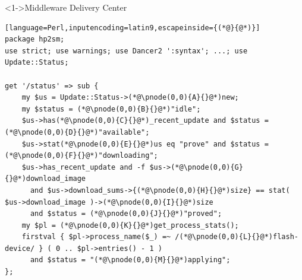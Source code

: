 \documentclass[ngerman,xcolor={table,dvipsnames},smaller,compress,hyperref={bookmarks,colorlinks}]{beamer}%
\begin{document}
\begin{frame}[t,fragile]

\begin{block}<1->{Middleware Delivery Center}
\scriptsize
\begin{lstlisting}[language=Perl,inputencoding=latin9,escapeinside={(*@}{@*)}]
package hp2sm;
use strict; use warnings; use Dancer2 ':syntax'; ...; use Update::Status;

get '/status' => sub {
    my $us = Update::Status->(*@\pnode(0,0){A}{}@*)new;
    my $status = (*@\pnode(0,0){B}{}@*)"idle";
    $us->has(*@\pnode(0,0){C}{}@*)_recent_update and $status = (*@\pnode(0,0){D}{}@*)"available";
    $us->stat(*@\pnode(0,0){E}{}@*)us eq "prove" and $status = (*@\pnode(0,0){F}{}@*)"downloading";
    $us->has_recent_update and -f $us->(*@\pnode(0,0){G}{}@*)download_image
      and $us->download_sums->{(*@\pnode(0,0){H}{}@*)size} == stat( $us->download_image )->(*@\pnode(0,0){I}{}@*)size
      and $status = (*@\pnode(0,0){J}{}@*)"proved";
    my $pl = (*@\pnode(0,0){K}{}@*)get_process_stats();
    firstval { $pl->process_name($_) =~ /(*@\pnode(0,0){L}{}@*)flash-device/ } ( 0 .. $pl->entries() - 1 )
      and $status = "(*@\pnode(0,0){M}{}@*)applying";
};
\end{lstlisting}
\end{block}

\begin{itemize}
\end{itemize}





\end{frame}
\end{document}
